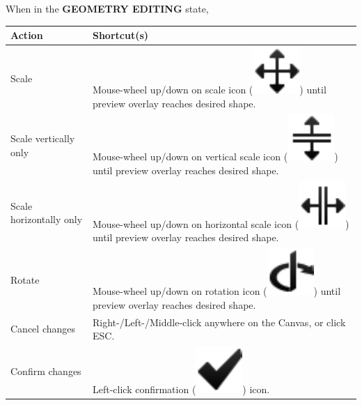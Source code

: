 \documentclass{article}
\numberwithin{equation}{section}
\numberwithin{figure}{section}
\begin{document}
When in the \textbf{GEOMETRY EDITING} state,\\

\begin{tabular}{| p{6cm}  p{10cm} |}
	\hline
	\textbf{Action} 				& \textbf{Shortcut(s)} \\ \hline \hline
	Scale			 				& Mouse-wheel up/down on scale icon (\includegraphics[scale=0.25]{figures/geomctrl_resize}) until preview overlay reaches desired shape. \\
	Scale vertically only			& Mouse-wheel up/down on vertical scale icon (\includegraphics[scale=0.25]{figures/geomctrl_resizeH}) until preview overlay reaches desired shape. \\
	Scale horizontally only 		& Mouse-wheel up/down on horizontal scale icon (\includegraphics[scale=0.25]{figures/geomctrl_resizeW}) until preview overlay reaches desired shape. \\
	Rotate 							& Mouse-wheel up/down on rotation icon (\includegraphics[scale=0.25]{figures/geomctrl_rotate}) until preview overlay reaches desired shape. \\
	Cancel changes					& Right-/Left-/Middle-click anywhere on the Canvas, or click ESC. \\ 
	Confirm changes					& Left-click confirmation (\includegraphics[scale=0.25]{figures/geomctrl_ok}) icon. \\ 
	\hline
\end{tabular}
\end{document}
